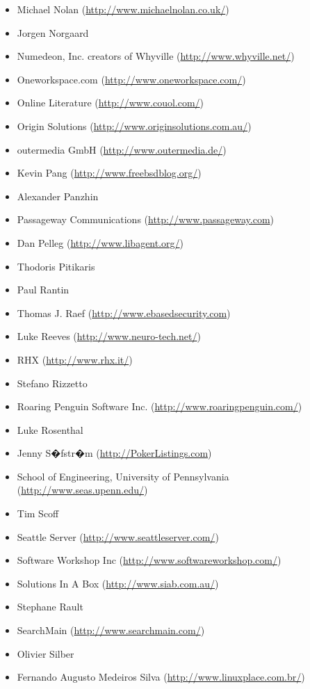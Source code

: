 \documentclass[a4paper,titlepage,12pt]{article}
\begin{document}
\begin{itemize}
	\item Michael Nolan (\url{http://www.michaelnolan.co.uk/})
	\item Jorgen Norgaard
	\item Numedeon, Inc. creators of Whyville (\url{http://www.whyville.net/})
	\item Oneworkspace.com (\url{http://www.oneworkspace.com/})
	\item Online Literature (\url{http://www.couol.com/})
	\item Origin Solutions (\url{http://www.originsolutions.com.au/})
	\item outermedia GmbH (\url{http://www.outermedia.de/})
	\item Kevin Pang (\url{http://www.freebsdblog.org/})
	\item Alexander Panzhin
	\item Passageway Communications (\url{http://www.passageway.com})
	\item Dan Pelleg (\url{http://www.libagent.org/})
	\item Thodoris Pitikaris
	\item Paul Rantin
	\item Thomas J. Raef (\url{http://www.ebasedsecurity.com})
	\item Luke Reeves (\url{http://www.neuro-tech.net/})
	\item RHX (\url{http://www.rhx.it/})
	\item Stefano Rizzetto
	\item Roaring Penguin Software Inc. (\url{http://www.roaringpenguin.com/})
	\item Luke Rosenthal
	\item Jenny S�fstr�m (\url{http://PokerListings.com})
	\item School of Engineering, University of Pennsylvania (\url{http://www.seas.upenn.edu/})
	\item Tim Scoff
	\item Seattle Server (\url{http://www.seattleserver.com/})
	\item Software Workshop Inc (\url{http://www.softwareworkshop.com/})
	\item Solutions In A Box (\url{http://www.siab.com.au/})
	\item Stephane Rault
	\item SearchMain (\url{http://www.searchmain.com/})
	\item Olivier Silber
	\item Fernando Augusto Medeiros Silva (\url{http://www.linuxplace.com.br/})

\end{itemize}
\end{document}
